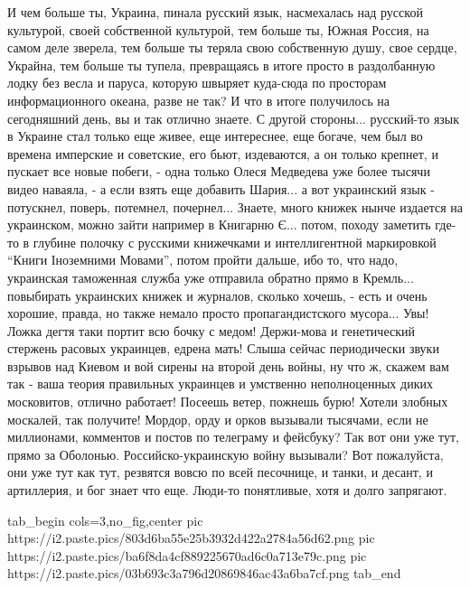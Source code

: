 И чем больше ты, Украина, пинала русский язык, насмехалась над русской
культурой, своей собственной культурой, тем больше ты, Южная Россия, на самом
деле зверела, тем больше ты теряла свою собственную душу, свое сердце, Украйна,
тем больше ты тупела, превращаясь в итоге просто в раздолбанную лодку без весла
и паруса, которую швыряет куда-сюда по просторам информационного океана, разве
не так? И что в итоге получилось на сегодняшний день, вы и так отлично знаете.
С другой стороны... русский-то язык в Украине стал только еще живее, еще
интереснее, еще богаче, чем был во времена имперские и советские, его бьют,
издеваются, а он только крепнет, и пускает все новые побеги, - одна только
Олеся Медведева уже более тысячи видео наваяла, - а если взять еще добавить
Шария... а вот украинский язык - потускнел, поверь, потемнел, почернел...
Знаете, много книжек нынче издается на украинском, можно зайти например в
Книгарню Є... потом, походу заметить где-то в глубине полочку с русскими
книжечками и интеллигентной маркировкой \enquote{Книги Іноземними Мовами},
потом пройти дальше, ибо то, что надо, украинская таможенная служба уже
отправила обратно прямо в Кремль... повыбирать украинских книжек и журналов,
сколько хочешь, - есть и очень хорошие, правда, но также немало просто
пропагандистского мусора...  Увы!  Ложка дегтя таки портит всю бочку с медом!
Держи-мова и генетический стержень расовых украинцев, едрена мать! Слыша сейчас
периодически звуки взрывов над Киевом и вой сирены на второй день войны, ну что
ж, скажем вам так - ваша теория правильных украинцев и умственно неполноценных
диких московитов, отлично работает!  Посеешь ветер, пожнешь бурю!  Хотели
злобных москалей, так получите! Мордор, орду и орков вызывали тысячами, если не
миллионами, комментов и постов по телеграму и фейсбуку? Так вот они уже тут,
прямо за Оболонью. Российско-украинскую войну вызывали? Вот пожалуйста, они
уже тут как тут, резвятся вовсю по всей песочнице, и танки, и десант, и
артиллерия, и бог знает что еще. Люди-то понятливые, хотя и долго запрягают.

\ifcmt
  tab_begin cols=3,no_fig,center
     pic https://i2.paste.pics/803d6ba55e25b3932d422a2784a56d62.png
		 pic https://i2.paste.pics/ba6f8da4cf889225670ad6c0a713e79c.png
		 pic https://i2.paste.pics/03b693c3a796d20869846ac43a6ba7cf.png
  tab_end
\fi

